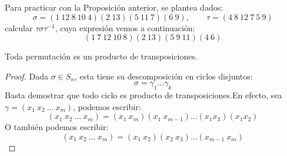 \begin{ejemplo}
    Para practicar con la Proposición anterior, se plantea dados:
    \begin{equation*}
        \sigma = (1\ 12\ 8\ 10\ 4)(2\ 13)(5\ 11\ 7)(6\ 9),\qquad \tau = (4\ 8\ 12\ 7\ 5\ 9)
    \end{equation*}
    calcular $\tau \sigma \tau^{-1}$, cuya expresión vemos a continuación:
    \begin{equation*}
        (1\ 7\ 12\ 10\ 8)(2\ 13)(5\ 9\ 11)(4\ 6)
    \end{equation*}
\end{ejemplo}

\begin{prop}\label{prop:perm_prod_transp}
    Toda permutación es un producto de transposiciones.
    \begin{proof}
        Dada $\sigma\in S_n$, esta tiene su descomposición en ciclos disjuntos:
        \begin{equation*}
            \sigma = \gamma_1\ldots\gamma_k
        \end{equation*}
        Basta demostrar que todo ciclo es producto de transposiciones.\newline En efecto, sea $\gamma = (x_1\ x_2\ \ldots\ x_m)$, podemos escribir:
        \begin{equation*}
            (x_1\ x_2\ \ldots\ x_m) = (x_1\ x_m)(x_1\ x_{m-1}) \ldots (x_1 x_3)(x_1 x_2)
        \end{equation*}
        O también podemos escribir:
        \begin{equation*}
            (x_1\ x_2\ \ldots\ x_m) = (x_1\ x_2)(x_2\ x_3) \ldots (x_{m-1}\ x_m)
        \end{equation*}
    \end{proof}
\end{prop}

